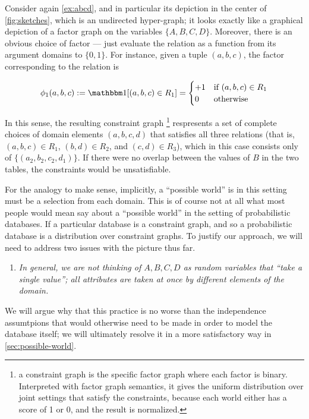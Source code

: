 \documentclass{article}
\theoremstyle{plain}
\theoremstyle{definition}
\theoremstyle{remark}
\begin{document}
Consider again \cref{ex:abcd}, and in particular its depiction in the center of \cref{fig:sketches}, which is an undirected hyper-graph; it looks exactly like a graphical depiction of a factor graph on the variables $\{A,B,C,D\}$. Moreover, there is an obvious choice of factor --- just evaluate the relation as a function from its argument domains to $\{0,1\}$. For instance, given a tuple $(a,b,c)$, the factor corresponding to the relation is
 
\[ \phi_1( a,b,c) := \mathbbm1[(a,b,c) \in R_1]=  \begin{cases}
	+1 & \text{if } (a,b,c) \in R_1 \\ 0 & \text{otherwise}
\end{cases}
\]
 
 
In this sense, the resulting constraint graph%
\footnote{a constraint graph is the specific factor graph where each factor is binary.
	Interpreted with factor graph semantics, it gives the uniform distribution over joint settings that satisfy the constraints, because each world either has a score of 1 or 0, and the result is normalized.}
respresents a set of complete choices of domain elements $(a,b,c,d)$ that satisfies all three relations (that is, $(a,b,c) \in R_1$, $(b,d) \in R_2$, and $(c,d) \in R_3$), which in this case consists only of $\{(a_2,b_2, c_2,d_1)\}$. If there were no overlap between the values of $B$ in the two tables, the constraints would be unsatisfiable. 


For the analogy to make sense, implicitly, a ``possible world'' is in this setting must be a selection from each domain.
This is of course not at all what most people would mean say about a ``possible world'' in the setting of probabilistic databases. 
If a particular database is a constraint graph, and so a probabilistic database is a distribution over constraint graphs. To justify our approach, we will need to address two issues with the picture thus far.

\begin{enumerate}
	\item  \itshape In general, we are not thinking of  $A, B, C, D$ as random variables that ``take a single value''; all attributes are taken at once by different elements of the domain. 
\end{enumerate}
We will argue why that this practice is no worse than the independence assumtpions that would otherwise need to be made  in order to model the database itself; we will ultimately resolve it in a more satisfactory way in \cref{sec:possible-world}.
\end{document}
